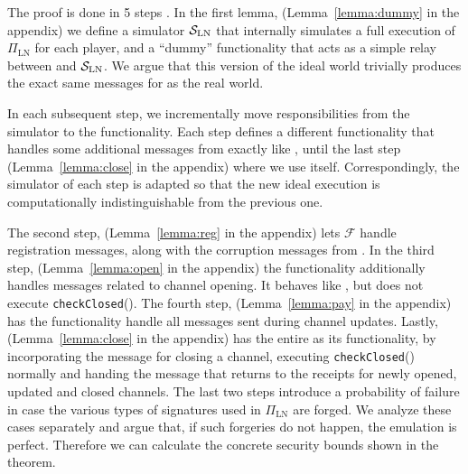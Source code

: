   \begin{proofsketch}
    The proof is done in 5 steps . In the first lemma, (Lemma~\ref{lemma:dummy} in the appendix) we define a simulator $\mathcal{S}_{\mathrm{LN}}$
    that internally simulates a full execution of $\Pi_{\mathrm{LN}}$ for each
    player, and a ``dummy'' functionality that acts as a simple relay between
    \environment{} and $\mathcal{S}_{\mathrm{LN}}$. We argue that this version of
    the ideal world trivially produces the exact same messages for
    \environment{} as the real world.

    In each subsequent step, we incrementally move responsibilities from the
    simulator to the functionality. Each step defines a
    different functionality that handles some additional messages from
    \environment{} exactly like \fpaynet, until the last step
    (Lemma~\ref{lemma:close} in the appendix) where we use \fpaynet{} itself. Correspondingly,
    the simulator of each step is adapted so that the new ideal execution is
    computationally indistinguishable from the previous one. 

    The second step, (Lemma~\ref{lemma:reg} in the appendix) lets $\mathcal{F}$ handle registration messages,
    along with the corruption messages from \simulator. In the third step,  (Lemma~\ref{lemma:open} in the appendix)
    the functionality additionally handles messages related to channel opening. It
    behaves like \fpaynet, but does not execute \texttt{checkClosed}().
    The fourth step, (Lemma~\ref{lemma:pay} in the appendix) has the functionality handle all messages sent during
    channel updates. Lastly, (Lemma~\ref{lemma:close} in the appendix) has the entire \fpaynet{} as
    its functionality, by incorporating the message for closing a channel,
    executing \texttt{checkClosed}() normally and handing the message that returns
    to \environment{} the receipts for newly opened, updated and closed
    channels. The last two steps introduce a probability of failure in case
    the various types of signatures used in  $\Pi_{\mathrm{LN}}$ are forged. We analyze these cases separately and argue that, if
    such forgeries do not happen, the emulation is perfect. Therefore we can
    calculate the concrete security bounds shown in the theorem.
  \end{proofsketch}
